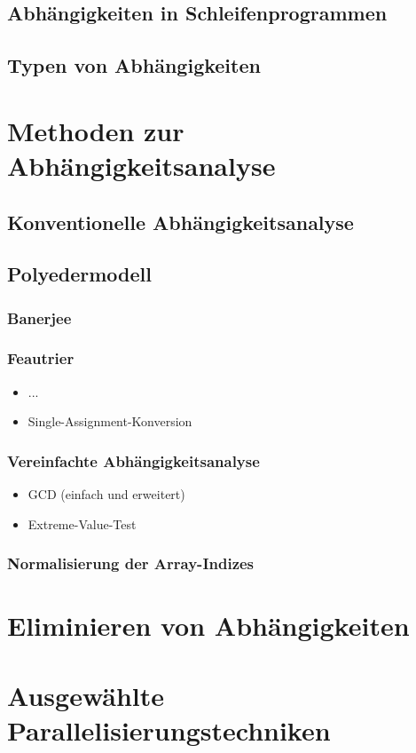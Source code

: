 \documentclass[a4paper,10pt]{scrartcl}
\begin{document}
\subsection{Abhängigkeiten in Schleifenprogrammen}
\subsection{Typen von Abhängigkeiten}
\section{Methoden zur Abhängigkeitsanalyse}
\subsection{Konventionelle Abhängigkeitsanalyse}
\subsection{Polyedermodell}
\subsubsection{Banerjee}
\subsubsection{Feautrier}
    \begin{itemize}
        \item ...
        \item Single-Assignment-Konversion
    \end{itemize}
\subsubsection{Vereinfachte Abhängigkeitsanalyse}
    \begin{itemize}
        \item GCD (einfach und erweitert)
        \item Extreme-Value-Test
    \end{itemize}
\subsubsection{Normalisierung der Array-Indizes}
\section{Eliminieren von Abhängigkeiten}
\section{Ausgewählte Parallelisierungstechniken}
\end{document}
